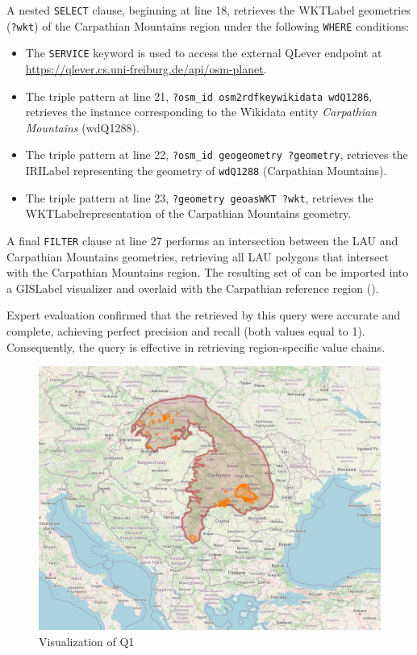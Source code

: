 A nested \texttt{SELECT} clause, beginning at line 18, retrieves the \acrshort{WKTLabel} geometries (\texttt{?wkt}) of the Carpathian Mountains region under the following \texttt{WHERE} conditions:
\begin{itemize}
    \item The \texttt{SERVICE} keyword is used to access the external QLever endpoint at \url{https://qlever.cs.uni-freiburg.de/api/osm-planet}.
    \item The triple pattern at line 21, \texttt{?osm\_id \gls{osm2rdfkey}wikidata \gls{wd}Q1286}, retrieves the instance corresponding to the Wikidata entity \textit{Carpathian Mountains} (\gls{wd}Q1288).
    \item The triple pattern at line 22, \texttt{?osm\_id \gls{geo}geometry ?geometry}, retrieves the \acrshort{IRILabel} representing the geometry of \texttt{\gls{wd}Q1288} (Carpathian Mountains).
    \item The triple pattern at line 23, \texttt{?geometry \gls{geo}asWKT ?wkt}, retrieves the \acrshort{WKTLabel}representation of the Carpathian Mountains geometry.
\end{itemize}

A final \texttt{FILTER} clause at line 27 performs an intersection between the LAU and Carpathian Mountains geometries, retrieving all LAU polygons that intersect with the Carpathian Mountains region. The resulting set of  can be imported into a \acrshort{GISLabel} visualizer and overlaid with the Carpathian reference region ().

Expert evaluation confirmed that the  retrieved by this query were accurate and complete, achieving perfect precision and recall (both values equal to 1). Consequently, the query is effective in retrieving region-specific value chains.

\begin{figure}[h!tb]
    \centerline {\includegraphics[scale=0.6]{img/carpathian.png}}
    \caption{Visualization of Q1}
    \label{fig:carpathian}
\end{figure}


